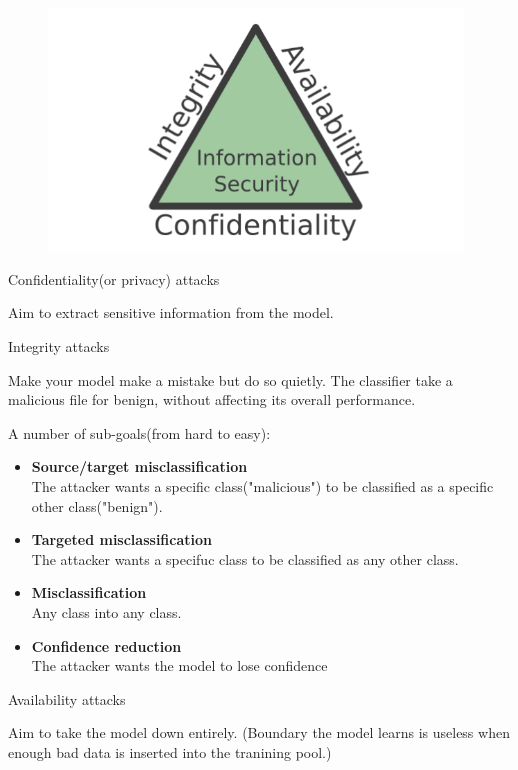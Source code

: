 \documentclass[11pt]{article}
\numberwithin{equation}{section}
\begin{document}
\begin{figure}[!h]
	\centering
	\includegraphics[width=11cm]{figures/triad.png}
	\label{fig:triad}
\end{figure}

\colorbox{orange!15}{Confidentiality(or privacy) attacks}

Aim to extract sensitive information from the model.

\colorbox{orange!15}{Integrity attacks}

Make your model make a mistake but do so quietly. The classifier take a malicious file for benign, without affecting its overall performance. 

A number of sub-goals(from hard to easy):

\begin{itemize}
    \item \textbf{Source/target misclassification}\\
    The attacker wants a specific class("malicious") to be classified as a specific other class("benign").
    \item \textbf{Targeted misclassification}\\
    The attacker wants a specifuc class to be classified as any other class.
    \item \textbf{Misclassification}\\
    Any class into any class.
    \item \textbf{Confidence reduction}\\
    The attacker wants the model to lose confidence
\end{itemize}

\colorbox{orange!15}{Availability attacks}

Aim to take the model down entirely. (Boundary the model learns is useless when enough bad data is inserted into the tranining pool.)
\end{document}
